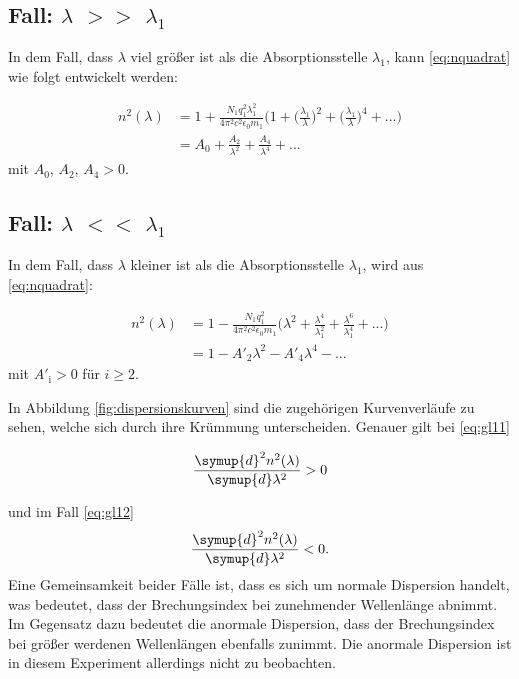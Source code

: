 \subsection{Fall: \texorpdfstring{$\lambda$}{Lambda} $>>$ \texorpdfstring{$\lambda_1$}{Lambda_1}}
In dem Fall, dass $\lambda$ viel größer ist als die Absorptionsstelle $\lambda_1$, kann \ref{eq:nquadrat} wie folgt entwickelt werden:

\begin{equation}
\begin{aligned}
\label{eq:gl11}
n^2(\lambda) &= 1 + \frac{N_1 q_1^2 \lambda_1^2}{4 \pi^2 c^2 \epsilon_0 m_1} \biggl(1 + \biggl(\frac{\lambda_1}{\lambda}\biggr)^2 + \biggl(\frac{\lambda_1}{\lambda}\biggr)^4 + ... \biggr) \\
&= A_0 + \frac{A_2}{\lambda^2} + \frac{A_4}{\lambda^4} + ...
\end{aligned}
\end{equation}
mit $A_0$, $A_2$, $A_4 > 0$.


\subsection{Fall: \texorpdfstring{$\lambda$}{Lambda} $<<$ \texorpdfstring{$\lambda_1$}{lambda_1}}
In dem Fall, dass $\lambda$ kleiner ist als die Absorptionsstelle $\lambda_1$, wird aus \ref{eq:nquadrat}:

\begin{equation}
\begin{aligned}
\label{eq:gl12}
n^2(\lambda) &= 1 - \frac{N_1 q_1^2}{4 \pi^2 c^2 \epsilon_0 m_1} \biggl(\lambda^2 + \frac{\lambda^4}{\lambda_1^2} + \frac{\lambda^6}{\lambda_1^4} + ... \biggr) \\
&= 1 - A'_2 \lambda^2 - A'_4 \lambda^4 - ...
\end{aligned}
\end{equation}
mit $A'_{\text{i}} > 0$ für $i \geq 2$.

In Abbildung \ref{fig:dispersionskurven} sind die zugehörigen Kurvenverläufe zu sehen, welche sich durch ihre Krümmung unterscheiden. Genauer gilt bei \ref{eq:gl11}

\begin{equation}
\frac{\symup{d}^2 n^2 (\lambda)}{\symup{d} \lambda^2} > 0
\end{equation}

und im Fall \ref{eq:gl12}
\begin{equation}
\frac{\symup{d}^2n^2(\lambda)}{\symup{d}\lambda^2} < 0.
\end{equation}
Eine Gemeinsamkeit beider Fälle ist, dass es sich um normale Dispersion handelt, was bedeutet, dass der Brechungsindex bei zunehmender Wellenlänge abnimmt. Im Gegensatz dazu bedeutet die anormale Dispersion,
dass der Brechungsindex bei größer werdenen Wellenlängen ebenfalls zunimmt. Die anormale Dispersion ist in diesem Experiment allerdings nicht zu beobachten.

